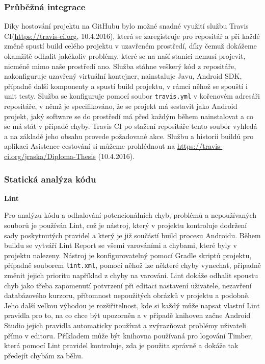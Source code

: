 \documentclass[czech,master,public,dept460,male,java,cpdeclaration]{diploma}
\begin{document}
 \subsubsection{Průběžná integrace}
 Díky hostování projektu na GitHubu bylo možné snadné využití službu Travis CI(\url{https://travis-ci.org}, 10.4.2016),
 která se zaregistruje pro repositář
 a při každé změně spustí build celého projektu v uzavřeném prostředí, díky čemuž dokážeme okamžitě
 odhalit jakékoliv problémy, které se na naší stanici nemusí projevit, nicméně mimo naše prostředí ano.
 Služba stáhne veškerý kód z repositáře, nakonfiguruje uzavřený virtuální kontejner, nainstaluje Javu, Android SDK,
 případně další komponenty a spustí build projektu, v rámci něhož se spouští i unit testy. Služba se konfiguruje pomocí
 soubor \texttt{travis.yml} v kořenovém adresáři repositáře, v němž je specifikováno, že se projekt má sestavit jako Android projekt,
 jaký software se do prostředí má před každým během nainstalovat a co se má stát v případě chyby. Travis CI po stažení
 repositáře tento soubor vyhledá a na základě jeho obsahu provede požadované akce.
 Službu a historii buildů pro aplikaci Asistence cestování si můžeme prohlédnout na \url{https://travis-ci.org/jraska/Diploma-Thesis} (10.4.2016).

 \subsubsection{Statická analýza kódu}

\noindent
 \textbf{Lint}


 Pro analýzu kódu a odhalování potencionálních chyb, problémů a nepoužívaných souborů je používán Lint,
  což je nástroj, který v projektu kontroluje dodržení sady poskytnutých pravidel a který
  je již součástí build procesu Androidu. Během buildu se vytváří Lint Report
  se všemi varováními a chybami, které byly v projektu nalezeny. Nástroj je konfigurovatelný pomocí
  Gradle skriptů projektu, případně souborem \texttt{lint.xml}, pomocí něhož lze některé chyby
  vynechat, případně změnit jejich prioritu například z chyby na varování.
  Lint dokáže odhalit spoustu chyb jako třeba zapomenutí potvrzení při editaci nastavení uživatele,
  nezavření databázového kurzoru, přítomnost nepoužitých obrázků v projektu a podobně.
  Jeho další velkou výhodou je rozšiřitelnost, kde si každý může napsat vlastní Lint pravidla pro to, na co chce být upozorněn
  a v případě knihoven začne Android Studio jejich pravidla automaticky používat a zvýrazňovat problémy uživateli
  přímo v editoru.
  Příkladem může být knihovna používaná pro logování Timber, která pomocí Lint pravidel
  kontroluje, zda je použita správně a dokáže tak předejít chybám za běhu.
\end{document}
